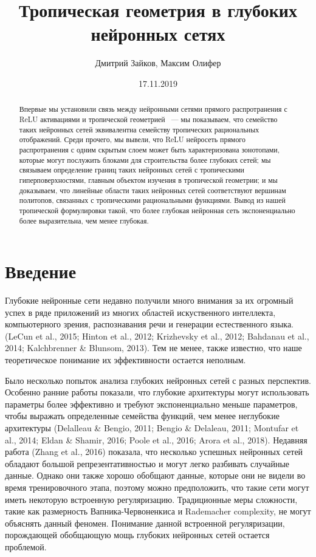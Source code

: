 \documentclass[russian]{lecture-notes}
\title{Тропическая геометрия в глубоких нейронных сетях}
\author{Дмитрий Зайков, Максим Олифер}
\date{17.11.2019}
\begin{document}
	\maketitle
	\newpage
	\begin{abstract}
		Впервые мы установили связь между нейронными сетями прямого распротранения с ReLU активациями и тропической геометрией ~--- мы показываем, что семейство таких нейронных сетей эквивалентна семейству тропических рациональных отображений. Среди прочего, мы вывели, что ReLU нейросеть прямого распротранения с одним скрытым слоем может быть характеризована зонотопами, которые могут послужить блоками для строительства более глубоких сетей; мы связываем определение границ таких нейронных сетей с тропическими гиперповерхностями, главным объектом изучения в тропической геометрии; и мы доказываем, что линейные области таких нейронных сетей соответствуют вершинам политопов, связанных с тропическими рациональными функциями. Вывод из нашей тропической формулировки такой, что более глубокая нейронная сеть экспоненциально более выразительна, чем менее глубокая.
	\end{abstract}
	
	\section{Введение}
	
	Глубокие нейронные сети недавно получили много внимания за их огромный успех в ряде приложений из многих областей искуственного интеллекта, компьютерного зрения, распознавания речи и генерации естественного языка. (LeCun et al., 2015; Hinton et al., 2012; Krizhevsky et al., 2012; Bahdanau et al., 2014; Kalchbrenner \& Blunsom, 2013). Тем не менее, также известно, что наше теоретическое понимание их эффективности остается неполным.
	
	Было несколько попыток анализа глубоких нейронных сетей с разных перспектив. Особенно ранние работы показали, что глубокие архитектуры могут использовать параметры более эффективно и требуют экспоненциально меньше параметров, чтобы выражать определенные семейства функций, чем менее неглубокие архитектуры (Delalleau \& Bengio, 2011; Bengio \& Delaleau, 2011; Montufar et al., 2014; Eldan \& Shamir, 2016; Poole et al., 2016; Arora et al., 2018). Недавняя работа (Zhang et al., 2016) показала, что несколько успешных нейронных сетей обладают большой репрезентативностью и могут легко разбивать случайные данные. Однако они также хорошо обобщают данные, которые они не видели во время тренировочного этапа, поэтому можно предположить, что такие сети могут иметь некоторую встроенную регуляризацию. Традиционные меры сложности, такие как размерность Вапника-Червоненкиса и Rademacher complexity, не могут объяснять данный феномен. Понимание данной встроенной регуляризации, порождающей обобщающую мощь глубоких нейронных сетей остается проблемой.
	
\end{document}
